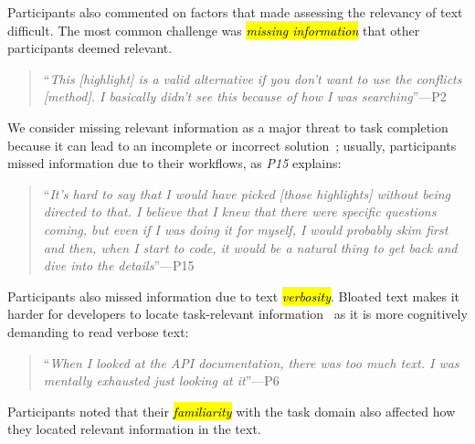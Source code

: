 Participants also commented on factors that made assessing the relevancy of text difficult.
The most common challenge was \hl{\textit{missing information}} that other participants deemed relevant.



\smallskip
\begin{quote}
    ``\textit{This [highlight] is a valid alternative if you don't want to use the conflicts [method]. I basically didn't see this because of how I was searching}''---P2
\end{quote}




We consider missing relevant information as a major threat to task completion because it can lead to an incomplete or incorrect solution~\cite{Murphy2005};
usually, participants missed information due to their workflows, as \textit{P15} explains:





\smallskip
\begin{quote}
    ``\textit{It's hard to say that I would have picked [those highlights] without being directed to that. I believe that I knew that there were specific questions coming, but even if I was doing it for myself, I would probably skim first and then, when I start to code, it would be a natural thing to get back and dive into the details}''---P15
\end{quote}



Participants also missed information due to text \hl{\textit{verbosity}}. 
Bloated text makes it harder for developers to locate task-relevant information~\cite{robillard2011field} as it is more cognitively demanding to read verbose text:


\smallskip
\begin{quote}
    ``\textit{When I looked at the API documentation, there was too much text. I was mentally exhausted just looking at it}''---P6
\end{quote}


Participants noted that their \hl{\textit{familiarity}} with the task domain also affected how they located relevant information in the text.



